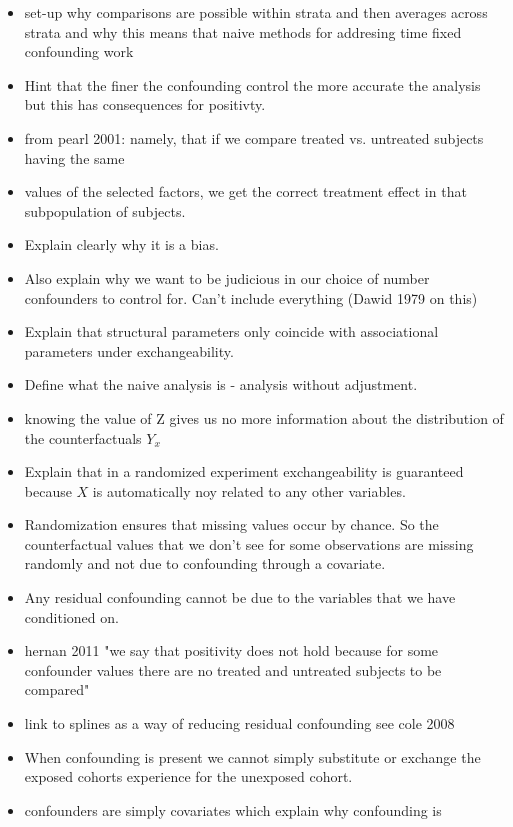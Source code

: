 \documentclass[11pt]{article}
\providecommand{\tightlist}{%
      \setlength{\itemsep}{0pt}\setlength{\parskip}{0pt}}
\begin{document}
\begin{itemize}
\tightlist
\item
  set-up why comparisons are possible within strata and then averages
  across strata and why this means that naive methods for addresing time
  fixed confounding work
\item
  Hint that the finer the confounding control the more accurate the
  analysis but this has consequences for positivty.
\item
  from pearl 2001: namely, that if we compare treated vs. untreated
  subjects having the same
\item
  values of the selected factors, we get the correct treatment effect in
  that subpopulation of subjects.
\item
  Explain clearly why it is a bias.
\item
  Also explain why we want to be judicious in our choice of number
  confounders to control for. Can't include everything (Dawid 1979 on
  this)
\item
  Explain that structural parameters only coincide with associational
  parameters under exchangeability.
\item
  Define what the naive analysis is - analysis without adjustment.
\item
  knowing the value of Z gives us no more information about the
  distribution of the counterfactuals \(Y_x\)
\item
  Explain that in a randomized experiment exchangeability is guaranteed
  because \(X\) is automatically noy related to any other variables.
\item
  Randomization ensures that missing values occur by chance. So the
  counterfactual values that we don't see for some observations are
  missing randomly and not due to confounding through a covariate.
\item
  Any residual confounding cannot be due to the variables that we have
  conditioned on.
\item
  hernan 2011 "we say that positivity does not hold because for some
  confounder values there are no treated and untreated subjects to be
  compared"
\item
  link to splines as a way of reducing residual confounding see cole
  2008
\item
  When confounding is present we cannot simply substitute or exchange
  the exposed cohorts experience for the unexposed cohort.
\item
  confounders are simply covariates which explain why confounding is

\end{itemize}
\end{document}
